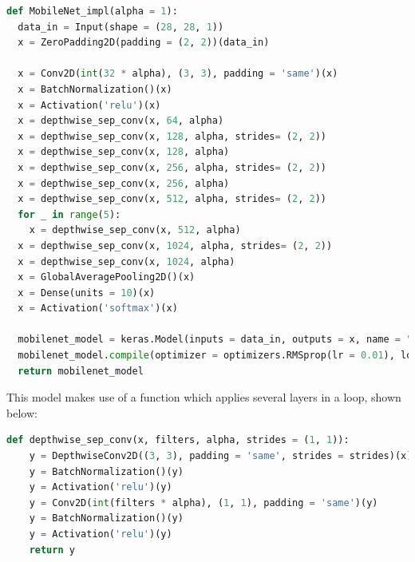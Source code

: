 \documentclass{article}
\begin{document}
\begin{lstlisting}[language=Python]
def MobileNet_impl(alpha = 1):
  data_in = Input(shape = (28, 28, 1))
  x = ZeroPadding2D(padding = (2, 2))(data_in)

  x = Conv2D(int(32 * alpha), (3, 3), padding = 'same')(x)
  x = BatchNormalization()(x)
  x = Activation('relu')(x)
  x = depthwise_sep_conv(x, 64, alpha)
  x = depthwise_sep_conv(x, 128, alpha, strides= (2, 2))
  x = depthwise_sep_conv(x, 128, alpha)
  x = depthwise_sep_conv(x, 256, alpha, strides= (2, 2))
  x = depthwise_sep_conv(x, 256, alpha)
  x = depthwise_sep_conv(x, 512, alpha, strides= (2, 2))
  for _ in range(5):
    x = depthwise_sep_conv(x, 512, alpha)
  x = depthwise_sep_conv(x, 1024, alpha, strides= (2, 2))
  x = depthwise_sep_conv(x, 1024, alpha)
  x = GlobalAveragePooling2D()(x)
  x = Dense(units = 10)(x)
  x = Activation('softmax')(x)

  mobilenet_model = keras.Model(inputs = data_in, outputs = x, name = "mobilenet_model")
  mobilenet_model.compile(optimizer = optimizers.RMSprop(lr = 0.01), loss = keras.losses.categorical_crossentropy, metrics = ['accuracy'])
  return mobilenet_model
\end{lstlisting}

This model makes use of a function which applies several layers in a loop, shown below:

\begin{lstlisting}[language=Python]
def depthwise_sep_conv(x, filters, alpha, strides = (1, 1)):
    y = DepthwiseConv2D((3, 3), padding = 'same', strides = strides)(x)
    y = BatchNormalization()(y)
    y = Activation('relu')(y)
    y = Conv2D(int(filters * alpha), (1, 1), padding = 'same')(y)
    y = BatchNormalization()(y)
    y = Activation('relu')(y)
    return y
\end{lstlisting}
\end{document}
